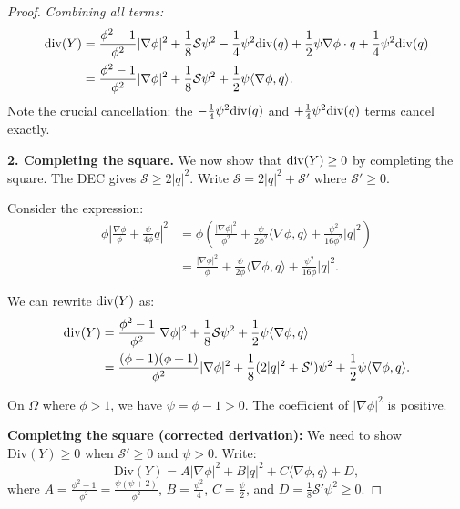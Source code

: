\begin{proof}
\textit{Combining all terms:}
\begin{align*}
    \mathrm{div}(Y) &= \frac{\phi^2-1}{\phi^2}|\nabla \phi|^2 + \frac{1}{8}\mathcal{S}\psi^2 - \frac{1}{4}\psi^2\mathrm{div}(q) + \frac{1}{2}\psi \nabla\phi \cdot q + \frac{1}{4}\psi^2 \mathrm{div}(q) \\
    &= \frac{\phi^2-1}{\phi^2}|\nabla \phi|^2 + \frac{1}{8}\mathcal{S}\psi^2 + \frac{1}{2}\psi\langle \nabla \phi, q \rangle.
\end{align*}
Note the crucial cancellation: the $-\frac{1}{4}\psi^2\mathrm{div}(q)$ and $+\frac{1}{4}\psi^2\mathrm{div}(q)$ terms cancel exactly.

\textbf{2. Completing the square.}
We now show that $\mathrm{div}(Y) \ge 0$ by completing the square. The DEC gives $\mathcal{S} \ge 2|q|^2$. Write $\mathcal{S} = 2|q|^2 + \mathcal{S}'$ where $\mathcal{S}' \ge 0$.

Consider the expression:
\begin{align*}
    \phi \left| \frac{\nabla \phi}{\phi} + \frac{\psi}{4\phi} q \right|^2 &= \phi \left( \frac{|\nabla\phi|^2}{\phi^2} + \frac{\psi}{2\phi^2}\langle\nabla\phi, q\rangle + \frac{\psi^2}{16\phi^2}|q|^2 \right) \\
    &= \frac{|\nabla\phi|^2}{\phi} + \frac{\psi}{2\phi}\langle\nabla\phi, q\rangle + \frac{\psi^2}{16\phi}|q|^2.
\end{align*}

We can rewrite $\mathrm{div}(Y)$ as:
\begin{align*}
    \mathrm{div}(Y) &= \frac{\phi^2-1}{\phi^2}|\nabla \phi|^2 + \frac{1}{8}\mathcal{S}\psi^2 + \frac{1}{2}\psi\langle \nabla \phi, q \rangle \\
    &= \frac{(\phi-1)(\phi+1)}{\phi^2}|\nabla \phi|^2 + \frac{1}{8}(2|q|^2 + \mathcal{S}')\psi^2 + \frac{1}{2}\psi\langle \nabla \phi, q \rangle.
\end{align*}

On $\Omega$ where $\phi > 1$, we have $\psi = \phi - 1 > 0$. The coefficient of $|\nabla\phi|^2$ is positive. 

\textbf{Completing the square (corrected derivation):} We need to show $\text{Div}(Y) \ge 0$ when $\mathcal{S}' \ge 0$ and $\psi > 0$. Write:
\begin{equation}
    \text{Div}(Y) = A|\nabla\phi|^2 + B|q|^2 + C\langle\nabla\phi, q\rangle + D,
\end{equation}
where $A = \frac{\phi^2-1}{\phi^2} = \frac{\psi(\psi+2)}{\phi^2}$, $B = \frac{\psi^2}{4}$, $C = \frac{\psi}{2}$, and $D = \frac{1}{8}\mathcal{S}'\psi^2 \ge 0$.


\end{proof}
